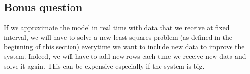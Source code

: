\documentclass[11pt]{article}
\begin{document}
\subsection*{Bonus question}
If we approximate the model in real time with data that we receive at fixed interval, we will have to solve a new least squares problem (as defined in the beginning of this section) everytime we want to include new data to improve the system. Indeed, we will have to add new rows each time we receive new data and solve it again. This can be expensive especially if the system is big.
\end{document}

